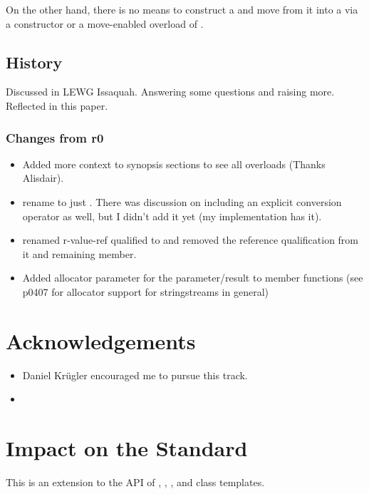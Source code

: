 \documentclass[ebook,11pt,article]{memoir}
\begin{document}
On the other hand, there is no means to construct a  and move from it into a  via a constructor or a move-enabled overload of .

\section{History}
Discussed in LEWG Issaquah. Answering some questions and raising more. Reflected in this paper.
\subsection{Changes from r0}
\begin{itemize}
\item Added more context to synopsis sections to see all overloads (Thanks Alisdair).
\item rename  to just . There was discussion on including an explicit conversion operator as well, but I didn't add it yet (my implementation has it).
\item renamed r-value-ref qualified  to  and removed the reference qualification from it and remaining  member.
\item Added allocator parameter for the  parameter/result to member functions (see p0407 for allocator support for stringstreams in general)
\end{itemize}


\chapter{Acknowledgements}
\begin{itemize}
\item Daniel Kr\"ugler encouraged me to pursue this track.
\item {}
\end{itemize}




\chapter{Impact on the Standard}
This is an extension to the API of , , , and  class templates.
\end{document}
